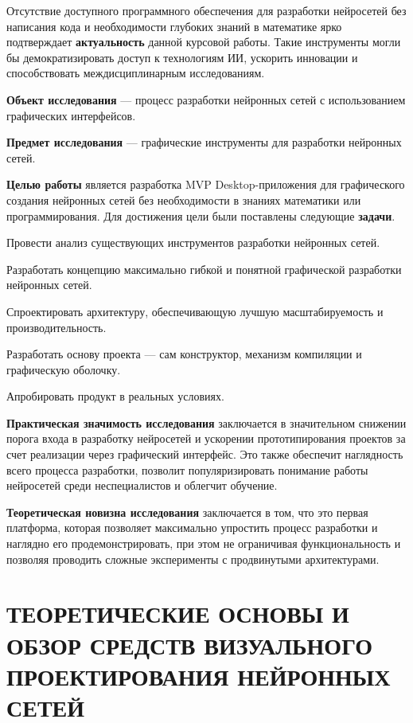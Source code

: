 \documentclass{report}
\begin{document}
Отсутствие доступного программного обеспечения для разработки нейросетей без написания кода и необходимости глубоких знаний в математике ярко подтверждает {\bf актуальность} данной курсовой работы. Такие инструменты могли бы демократизировать доступ к технологиям ИИ, ускорить инновации и способствовать междисциплинарным исследованиям.

{\bf Объект исследования} --- процесс разработки нейронных сетей с использованием графических интерфейсов.

{\bf Предмет исследования} --- графические инструменты для разработки нейронных сетей.

{\bf Целью работы } является разработка MVP Desktop-приложения для графического создания нейронных сетей без необходимости в знаниях математики или программирования. Для достижения цели были поставлены следующие {\bf задачи}.

\begin{enumarabic}
\item Провести анализ существующих инструментов разработки нейронных сетей.
\item Разработать концепцию максимально гибкой и понятной графической разработки нейронных сетей.
\item Спроектировать архитектуру, обеспечивающую лучшую масштабируемость и производительность.
\item Разработать основу проекта — сам конструктор, механизм компиляции и графическую оболочку.
\item Апробировать продукт в реальных условиях.
\end{enumarabic}

{\bf Практическая значимость исследования} заключается в значительном снижении порога входа в разработку нейросетей и ускорении прототипирования проектов за счет реализации через графический интерфейс. Это также обеспечит наглядность всего процесса разработки, позволит популяризировать понимание работы нейросетей среди неспециалистов и облегчит обучение.

{\bf Теоретическая новизна исследования} заключается в том, что это первая платформа, которая позволяет максимально упростить процесс разработки и наглядно его продемонстрировать, при этом не ограничивая функциональность и позволяя проводить сложные эксперименты с продвинутыми архитектурами.

\setcounter{section}{0} 
\setcounter{subsection}{0} 
\setcounter{equation}{0} 

\chapter{ТЕОРЕТИЧЕСКИЕ ОСНОВЫ И ОБЗОР СРЕДСТВ ВИЗУАЛЬНОГО ПРОЕКТИРОВАНИЯ НЕЙРОННЫХ СЕТЕЙ}
\end{document}
